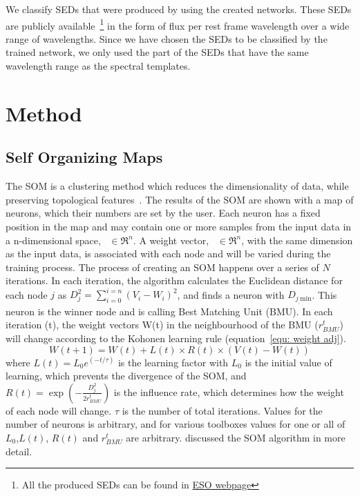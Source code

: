     We classify SEDs that were produced by  using the created networks.
    These SEDs are publicly available~\footnote{All the  produced SEDs can be found in \href{http://telbib.eso.org/detail.php?bibcode=2012AJ....144..172T}{ESO webpage}} in the form of flux per rest frame wavelength over a wide range of wavelengths.
    Since we have chosen the  SEDs to be classified by the trained network, we only used the part of the SEDs that have the same wavelength range as the  spectral templates.  
\section{Method}
\label{sec: method_somz}
 \subsection{Self Organizing Maps}
 \label{sec: som_SOMZ}
  The SOM is a clustering method which reduces the dimensionality of data, while preserving topological features~\citep{Kohonen98}. 
 The results of the SOM are shown with a map of neurons, which their numbers are set by the user.
 Each neuron has a fixed position in the map and may contain one or more samples from the input data in a n-dimensional space,~ $\in \Re^n$.
 A weight vector,~ $\in \Re^n$, with the same dimension as the input data, is associated with each node and will be varied during the training process.
 The process of creating an SOM happens over a series of $N$ iterations.
 In each iteration, the algorithm calculates the Euclidean distance for each node $j$ as $D_j^2= \sum_{i=0}^{i=n} (V_i - W_i)^2$, and finds a neuron with $D_{j_,\mathrm{min}}$. 
 This neuron is the winner node and is calling Best Matching Unit (BMU). 
 In each iteration (t), the weight vectors W(t) in the neighbourhood of the BMU ($r^t_{BMU}$) will change according to the Kohonen learning rule (equation~\ref{equ: weight adj}). 
  \begin{equation}
            \label{equ: weight adj}
            W(t+1)=W(t)+L(t) \times R(t) \times(V(t)-W(t))
 \end{equation}
where $L(t) = L_0 e^{(-t/\tau)}$ is the learning factor with $L_0$ is the initial value of learning, which prevents the divergence of the SOM, and $R(t)=\exp(-\frac{D_j^2}{2r^t_{BMU}})$ is the influence rate, which determines how the weight of each node will change. 
$\tau$ is the number of total iterations.
Values for the number of neurons is arbitrary, and for various toolboxes values for one or all of $L_0$,$L(t)$, $R(t)$  and $r^t_{BMU}$ are arbitrary.
\cite{Geach12} discussed the SOM algorithm in more detail.



